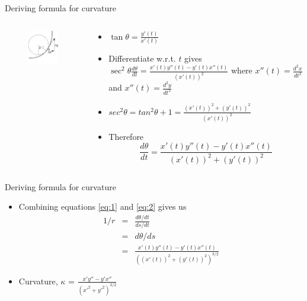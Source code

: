 \documentclass{beamer}
\begin{document}
\begin{frame}{Deriving formula for curvature}
	\begin{columns}
		\begin{column}{0.4\textwidth}			
			\begin{figure}
				\centering
				\includegraphics[width=40mm, scale=0.3]{curvature_illustration_2.png}
			\end{figure}
		\end{column}
		\begin{column}{0.75\textwidth}			

			\begin{itemize}
				\item $\tan \theta = \frac{y'(t)}{x'(t)}$ 
				\item Differentiate w.r.t. $t$ gives $\sec ^2 \theta \frac{d\theta}{dt} = \frac{x'(t) y''(t) - y'(t) x''(t)}{(x'(t))^2}$
				where $x''(t)=\frac{d^2 x}{dt^2}$ and $x''(t)=\frac{d^2 y}{dt^2}$
				\item $sec^2\theta = tan^2\theta +1 = \frac{{(x'(t))^2+(y'(t))^2}}{(x'(t))^2}$ 
				\item Therefore
				\begin{equation} \label{eq:2}
				\frac{d\theta}{dt}=\frac{x'(t) y''(t) - y'(t) x''(t)}{(x'(t))^2+(y'(t))^2}
				\end{equation}

			\end{itemize}
	\end{column}
\end{columns}
\end{frame}

\begin{frame}{Deriving formula for curvature}
	\begin{itemize}
		\item Combining equations \ref{eq:1} and \ref{eq:2} gives us
		\begin{eqnarray*}
			1/r &=& \frac{d\theta/dt}{ds/dt}  \\
			    &=& d\theta/ds \\
			    &=& \frac{x'(t) y''(t) - y'(t) x''(t)}{\left( (x'(t))^2 + (y'(t))^2 \right)^{3/2}}
		\end{eqnarray*}
		
		\item Curvature, $\kappa$ = $\frac{x' y'' - y' x''}{(x'^2+y'^2)^{3/2}} $
	\end{itemize}
	
\end{frame}
\end{document}
